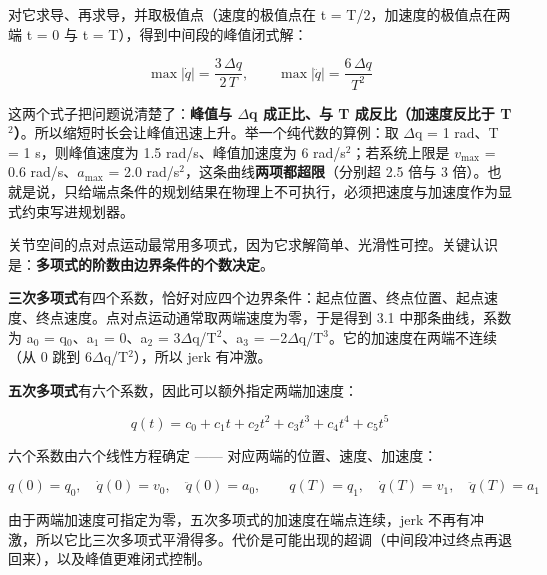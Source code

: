 \documentclass[11pt,a4paper]{ctexart}
\newcommand{\hTwo}[1]{\par\vspace{0.8em}{\color{hmid}\large\bfseries #1}\par\vspace{0.25em}}
\begin{document}
对它求导、再求导，并取极值点（速度的极值点在 t = T/2，加速度的极值点在两端 t = 0 与 t = T），得到中间段的峰值闭式解：\par

\begin{equation}\max|\dot q|=\frac{3\,\Delta q}{2\,T},\qquad \max|\ddot q|=\frac{6\,\Delta q}{T^{2}}\end{equation}

这两个式子把问题说清楚了：\textbf{峰值与 $\Delta$q 成正比、与 T 成反比（加速度反比于 T$^{2}$）}。所以缩短时长会让峰值迅速上升。举一个纯代数的算例：取 $\Delta$q = 1 rad、T = 1 s，则峰值速度为 1.5 rad/s、峰值加速度为 6 rad/s$^{2}$；若系统上限是 $v_{\mathrm{max}}$ = 0.6 rad/s、$a_{\mathrm{max}}$ = 2.0 rad/s$^{2}$，这条曲线\textbf{两项都超限}（分别超 2.5 倍与 3 倍）。也就是说，只给端点条件的规划结果在物理上不可执行，必须把速度与加速度作为显式约束写进规划器。\par

\hTwo{3.2 多项式插值的数学：三次与五次}

关节空间的点对点运动最常用多项式，因为它求解简单、光滑性可控。关键认识是：\textbf{多项式的阶数由边界条件的个数决定}。\par

\textbf{三次多项式}有四个系数，恰好对应四个边界条件：起点位置、终点位置、起点速度、终点速度。点对点运动通常取两端速度为零，于是得到 3.1 中那条曲线，系数为 a$_{0}$ = q$_{0}$、a$_{1}$ = 0、a$_{2}$ = 3$\Delta$q/T$^{2}$、a$_{3}$ = $-$2$\Delta$q/T$^{3}$。它的加速度在两端不连续（从 0 跳到 6$\Delta$q/T$^{2}$），所以 jerk 有冲激。\par

\textbf{五次多项式}有六个系数，因此可以额外指定两端加速度：\par

\begin{equation}q(t)=c_0+c_1t+c_2t^{2}+c_3t^{3}+c_4t^{4}+c_5t^{5}\end{equation}

六个系数由六个线性方程确定 —— 对应两端的位置、速度、加速度：\par

\begin{equation}q(0)=q_0,\quad\dot q(0)=v_0,\quad\ddot q(0)=a_0,\qquad q(T)=q_1,\quad\dot q(T)=v_1,\quad\ddot q(T)=a_1\end{equation}

由于两端加速度可指定为零，五次多项式的加速度在端点连续，jerk 不再有冲激，所以它比三次多项式平滑得多。代价是可能出现的超调（中间段冲过终点再退回来），以及峰值更难闭式控制。\par
\end{document}
